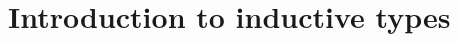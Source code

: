 \documentclass[hott-all.tex]{subfiles}
\begin{document}
\section{Introduction to inductive types}
% 
% 
\end{document}
